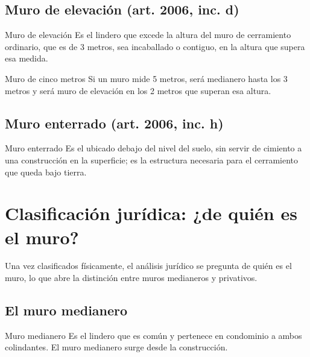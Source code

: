 \documentclass[12pt,oneside]{book}
\begin{document}
\subsection{Muro de elevación (art. 2006, inc. d)}


\begin{definition}{Muro de elevación}
Es el lindero que excede la altura del muro de cerramiento ordinario, que es de 3 metros, sea incaballado o contiguo, en la altura que supera esa medida.
\end{definition}

\begin{example}{Muro de cinco metros}
Si un muro mide 5 metros, será medianero hasta los 3 metros y será muro de elevación en los 2 metros que superan esa altura.
\end{example}

\subsection{Muro enterrado (art. 2006, inc. h)}

\begin{definition}{Muro enterrado}
Es el ubicado debajo del nivel del suelo, sin servir de cimiento a una construcción en la superficie; es la estructura necesaria para el cerramiento que queda bajo tierra.
\end{definition}

\section{Clasificación jurídica: ¿de quién es el muro?}

Una vez clasificados físicamente, el análisis jurídico se pregunta de quién es el muro, lo que abre la distinción entre muros medianeros y privativos.

\subsection{El muro medianero}


\begin{definition}{Muro medianero}
Es el lindero que es común y pertenece en condominio a ambos colindantes. El muro medianero surge desde la construcción.
\end{definition}
\end{document}
